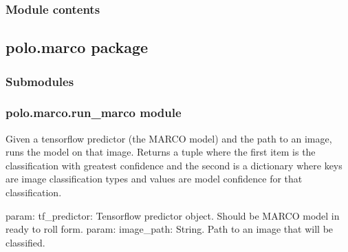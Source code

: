 \documentclass[letterpaper,10pt,english]{sphinxmanual}
\begin{document}
\subsubsection{Module contents}
\label{\detokenize{polo.crystallography:module-polo.crystallography}}\label{\detokenize{polo.crystallography:module-contents}}

\subsection{polo.marco package}
\label{\detokenize{polo.marco:polo-marco-package}}\label{\detokenize{polo.marco::doc}}

\subsubsection{Submodules}
\label{\detokenize{polo.marco:submodules}}

\subsubsection{polo.marco.run\_marco module}
\label{\detokenize{polo.marco:module-polo.marco.run_marco}}\label{\detokenize{polo.marco:polo-marco-run-marco-module}}

\begin{fulllineitems}
\label{\detokenize{polo.marco:polo.marco.run_marco.classify_image}}
Given a tensorflow predictor (the MARCO model) and the path to an image, 
runs the model on that image. Returns a tuple where the first item is the
classification with greatest confidence and the second is a dictionary where
keys are image classification types and values are model confidence for that
classification.

param: tf\_predictor: Tensorflow predictor object. Should be MARCO model         in ready to roll form.
param: image\_path: String. Path to an image that will be classified.

\end{fulllineitems}
\end{document}
